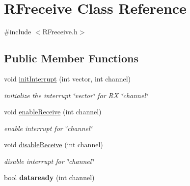 \hypertarget{class_r_freceive}{}\section{R\+Freceive Class Reference}
\label{class_r_freceive}


{\ttfamily \#include $<$R\+Freceive.\+h$>$}

\subsection*{Public Member Functions}
\begin{DoxyCompactItemize}
\item 
\mbox{\label{class_r_freceive_a1449b9fc5ca1c08869eadd3990d9236c}} 
void \mbox{\hyperlink{class_r_freceive_a1449b9fc5ca1c08869eadd3990d9236c}{init\+Interrupt}} (int vector, int channel)
\begin{DoxyCompactList}\small\item\em initialize the interrupt \char`\"{}vector\char`\"{} for RX \char`\"{}channel\char`\"{} \end{DoxyCompactList}\item 
\mbox{\label{class_r_freceive_afb1e852bcae003d5d119debc4e73a2eb}} 
void \mbox{\hyperlink{class_r_freceive_afb1e852bcae003d5d119debc4e73a2eb}{enable\+Receive}} (int channel)
\begin{DoxyCompactList}\small\item\em enable interrupt for \char`\"{}channel\char`\"{} \end{DoxyCompactList}\item 
\mbox{\label{class_r_freceive_ab8b545efe94b82be8d1feef08c29340d}} 
void \mbox{\hyperlink{class_r_freceive_ab8b545efe94b82be8d1feef08c29340d}{disable\+Receive}} (int channel)
\begin{DoxyCompactList}\small\item\em disable interrupt for \char`\"{}channel\char`\"{} \end{DoxyCompactList}\item 
\mbox{\label{class_r_freceive_a2d3c05696fabff62bdc06e1feedadc48}} 
bool {\bfseries dataready} (int channel)
\item 
\mbox{\label{class_r_freceive_a19e27dbf9e597c8df7fd0ba5ebcddcb4}} 

\end{DoxyCompactItemize}
